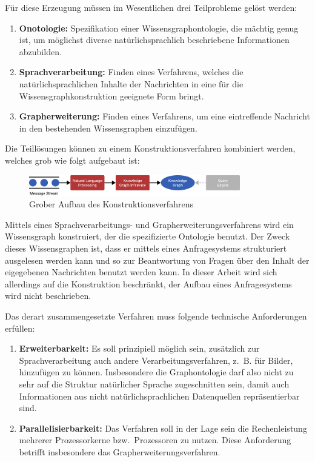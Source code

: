 Für diese Erzeugung müssen im Wesentlichen drei Teilprobleme gelöst werden:
\begin{enumerate}
	\item \textbf{Onotologie:}
		Spezifikation einer Wissensgraphontologie, die mächtig genug ist, um möglichst diverse natürlichsprachlich beschriebene Informationen abzubilden.
	\item \textbf{Sprachverarbeitung:}
		Finden eines Verfahrens, welches die natürlichsprachlichen Inhalte der Nachrichten in eine für die Wissensgraphkonstruktion geeignete Form bringt.
	\item \textbf{Grapherweiterung:}
		Finden eines Verfahrens, um eine eintreffende Nachricht in den bestehenden Wissensgraphen einzufügen.
\end{enumerate}
Die Teillösungen können zu einem Konstruktionsverfahren kombiniert werden, welches grob wie folgt aufgebaut ist:
\begin{figure}[h]
	\centering
	\includegraphics[width=0.82\textwidth]{gfx/introduction/overview.pdf}
	\caption{Grober Aufbau des Konstruktionsverfahrens}\label{fig:intro:overview}
\end{figure}

Mittels eines Sprachverarbeitungs- und Grapherweiterungsverfahrens wird ein Wissensgraph konstruiert, der die spezifizierte Ontologie benutzt.
Der Zweck dieses Wissensgraphen ist, dass er mittels eines Anfragesystems strukturiert ausgelesen werden kann und so zur Beantwortung von Fragen über den Inhalt der eigegebenen Nachrichten benutzt werden kann.
In dieser Arbeit wird sich allerdings auf die Konstruktion beschränkt, der Aufbau eines Anfragesystems wird nicht beschrieben.

Das derart zusammengesetzte Verfahren muss folgende technische Anforderungen erfüllen:
\begin{enumerate}
	\item \textbf{Erweiterbarkeit:}
		Es soll prinzipiell möglich sein, zusätzlich zur Sprachverarbeitung auch andere Verarbeitungsverfahren, z.~B. für Bilder, hinzufügen zu können.
		Insbesondere die Graphontologie darf also nicht zu sehr auf die Struktur natürlicher Sprache zugeschnitten sein, damit auch Informationen aus nicht natürlichsprachlichen Datenquellen repräsentierbar sind.
	\item \textbf{Parallelisierbarkeit:}
		Das Verfahren soll in der Lage sein die Rechenleistung mehrerer Prozessorkerne bzw.\ Prozessoren zu nutzen.
		Diese Anforderung betrifft insbesondere das Grapherweiterungsverfahren.
\end{enumerate}

